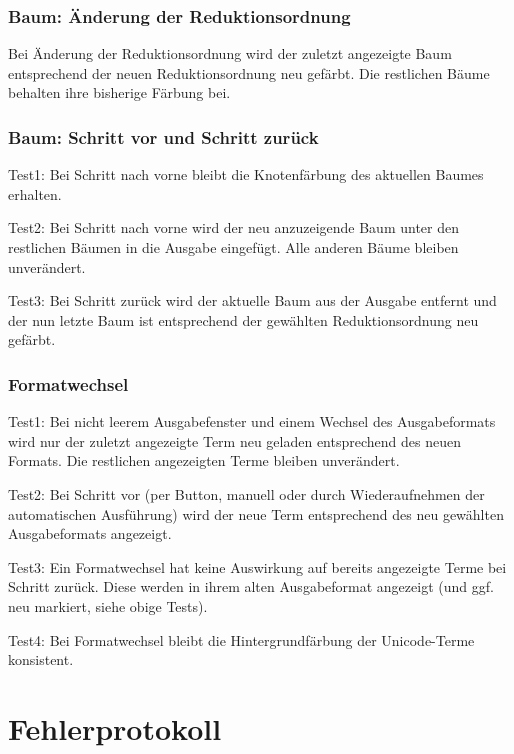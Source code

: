 \documentclass[parskip=full,11pt,openany]{scrreprt}
\begin{document}
\subsection{Baum: Änderung der Reduktionsordnung}
Bei Änderung der Reduktionsordnung wird der zuletzt angezeigte Baum entsprechend der neuen Reduktionsordnung neu gefärbt. Die restlichen Bäume behalten ihre bisherige Färbung bei.

\subsection{Baum: Schritt vor und Schritt zurück}
Test1: Bei Schritt nach vorne bleibt die Knotenfärbung des aktuellen Baumes erhalten.

Test2: Bei Schritt nach vorne wird der neu anzuzeigende Baum unter den restlichen Bäumen in die Ausgabe eingefügt. Alle anderen Bäume bleiben unverändert.

Test3: Bei Schritt zurück wird der aktuelle Baum aus der Ausgabe entfernt und der nun letzte Baum ist entsprechend der gewählten Reduktionsordnung neu gefärbt.

\subsection{Formatwechsel}
Test1: Bei nicht leerem Ausgabefenster und einem Wechsel des Ausgabeformats wird nur der zuletzt angezeigte Term neu geladen entsprechend des neuen Formats. Die restlichen angezeigten Terme bleiben unverändert.

Test2: Bei Schritt vor (per Button, manuell oder durch Wiederaufnehmen der automatischen Ausführung) wird der neue Term entsprechend des neu gewählten Ausgabeformats angezeigt. 

Test3: Ein Formatwechsel hat keine Auswirkung auf bereits angezeigte Terme bei Schritt zurück. Diese werden in ihrem alten Ausgabeformat angezeigt (und ggf. neu markiert, siehe obige Tests).

Test4: Bei Formatwechsel bleibt die Hintergrundfärbung der Unicode-Terme konsistent. %



\chapter{Fehlerprotokoll}
\end{document}
